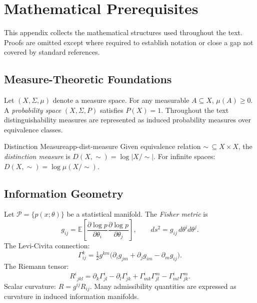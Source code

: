 \documentclass[12pt,twoside,openright]{book}
\begin{document}
\chapter{Mathematical Prerequisites}
\label{app:math}

This appendix collects the mathematical structures used
throughout the text. Proofs are omitted except where
required to establish notation or close a gap not covered
by standard references.

\section{Measure-Theoretic Foundations}

Let $(X, \Sigma, \mu)$ denote a measure space.
For any measurable $A \subseteq X$, $\mu(A) \ge 0$.
A \emph{probability space} $(X, \Sigma, P)$ satisfies
$P(X) = 1$.
Throughout the text distinguishability measures are
represented as induced probability measures over
equivalence classes.

\begin{definition}{Distinction Measure}{app-dist-measure}
  Given equivalence relation $\sim\,\subseteq X \times X$,
  the \emph{distinction measure} is
  $D(X, \sim) = \log |X/{\sim}|$.
  For infinite spaces: $D(X, \sim) = \log \mu(X/{\sim})$.
\end{definition}

\section{Information Geometry}

Let $\mathcal{P} = \{p(x;\theta)\}$ be a statistical
manifold. The \emph{Fisher metric} is
\[
  g_{ij}
  = \mathbb{E}\!\left[
      \frac{\partial\log p}{\partial\theta_i}
      \frac{\partial\log p}{\partial\theta_j}
    \right],
  \qquad
  ds^2 = g_{ij}\,d\theta^i d\theta^j.
\]
The Levi-Civita connection:
\[
  \Gamma^k_{ij}
  = \tfrac{1}{2} g^{km}
    \bigl(\partial_i g_{jm} + \partial_j g_{im}
          - \partial_m g_{ij}\bigr).
\]
The Riemann tensor:
\[
  R^i{}_{\!jkl}
  = \partial_k\Gamma^i_{jl} - \partial_l\Gamma^i_{jk}
  + \Gamma^i_{mk}\Gamma^m_{jl}
  - \Gamma^i_{ml}\Gamma^m_{jk}.
\]
Scalar curvature: $R = g^{ij}R_{ij}$.
Many admissibility quantities are expressed as curvature
in induced information manifolds.
\end{document}
